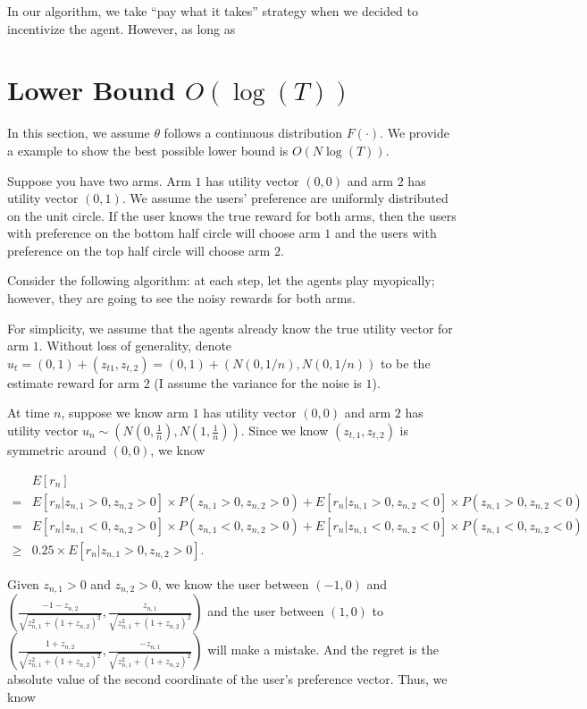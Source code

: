 \documentclass{article}
\begin{document}
In our algorithm, we take ``pay what it takes'' strategy when we decided to incentivize the agent. However, as long as 

\section{Lower Bound $O(\log(T))$}
\label{sec:lb}

In this section, we assume $\theta$ follows a continuous distribution $F(\cdot)$. We provide a example to show the best possible lower bound is $O(N\log(T))$.

Suppose you have two arms. Arm $1$ has utility vector $(0,0)$ and arm $2$ has utility vector $(0,1)$. We assume the users' preference are uniformly distributed on the unit circle. If the user knows the true reward for both arms, then the users with preference on the bottom half circle will choose arm $1$ and the users with preference on the top half circle will choose arm $2$.


Consider the following algorithm: at each step, let the agents play myopically; however, they are going to see the noisy rewards for both arms.

For simplicity, we assume that the agents already know the true utility vector for arm $1$. Without loss of generality, denote $u_{t} = (0,1)+(z_{t1},z_{t,2}) = (0,1)+ (N(0,1/n),N(0,1/n))$ to be the estimate reward for arm $2$ (I assume the variance for the noise is $1$). 


At time $n$, suppose we know arm $1$ has utility vector $(0,0)$ and arm $2$ has utility vector $u_n\sim (N(0,\frac{1}{n}), N(1,\frac{1}{n}))$. Since we know $(z_{t,1}, z_{t,2})$ is symmetric around $(0,0)$, we know 

\begin{align}
&E[r_n] \nonumber \\
= &E[r_n | z_{n,1}>0,z_{n,2}>0] \times P(z_{n,1}>0,z_{n,2}>0) + E[r_n |z_{n,1}>0,z_{n,2}<0] \times P(z_{n,1}>0,z_{n,2}<0) \nonumber \\
= &E[r_n | z_{n,1}<0,z_{n,2}>0] \times P(z_{n,1}<0,z_{n,2}>0) + E[r_n |z_{n,1}<0,z_{n,2}<0] \times P(z_{n,1}<0,z_{n,2}<0) \nonumber \\
\geq & 0.25 \times E[r_n | z_{n,1}>0, z_{n,2}>0]. \nonumber
\end{align}

Given $z_{n,1}>0$ and $z_{n,2}>0$, we know the user between $(-1,0)$ and $(\frac{-1-z_{n,2}}{\sqrt{z_{n,1}^2+(1+z_{n,2})^2}}, \frac{z_{n,1}}{\sqrt{z_{n,1}^2+(1+z_{n,2})^2}})$ and the user between $(1,0)$ to $(\frac{1+z_{n,2}}{\sqrt{z_{n,1}^2+(1+z_{n,2})^2}}, \frac{-z_{n,1}}{\sqrt{z_{n,1}^2+(1+z_{n,2})^2}})$ will make a mistake. And the regret is the absolute value of the second coordinate of the user's preference vector. Thus, we know
\end{document}
